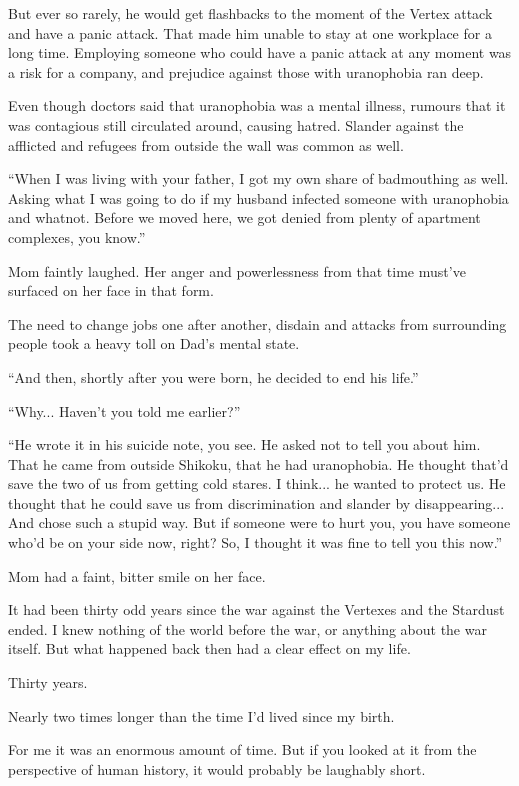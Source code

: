 But ever so rarely, he would get flashbacks to the moment of the Vertex attack and have a panic attack. That made him unable to stay at one workplace for a long time. Employing someone who could have a panic attack at any moment was a risk for a company, and prejudice against those with uranophobia ran deep.

Even though doctors said that uranophobia was a mental illness, rumours that it was contagious still circulated around, causing hatred. Slander against the afflicted and refugees from outside the wall was common as well.

``When I was living with your father, I got my own share of badmouthing as well. Asking what I was going to do if my husband infected someone with uranophobia and whatnot. Before we moved here, we got denied from plenty of apartment complexes, you know.''

Mom faintly laughed. Her anger and powerlessness from that time must've surfaced on her face in that form.

The need to change jobs one after another, disdain and attacks from surrounding people took a heavy toll on Dad's mental state.

``And then, shortly after you were born, he decided to end his life.''

``Why... Haven't you told me earlier?''

``He wrote it in his suicide note, you see. He asked not to tell you about him. That he came from outside Shikoku, that he had uranophobia. He thought that'd save the two of us from getting cold stares. I think... he wanted to protect us. He thought that he could save us from discrimination and slander by disappearing... And chose such a stupid way. But if someone were to hurt you, you have someone who'd be on your side now, right? So, I thought it was fine to tell you this now.''

Mom had a faint, bitter smile on her face.

It had been thirty odd years since the war against the Vertexes and the Stardust ended. I knew nothing of the world before the war, or anything about the war itself. But what happened back then had a clear effect on my life.

Thirty years.

Nearly two times longer than the time I'd lived since my birth.

For me it was an enormous amount of time. But if you looked at it from the perspective of human history, it would probably be laughably short.

